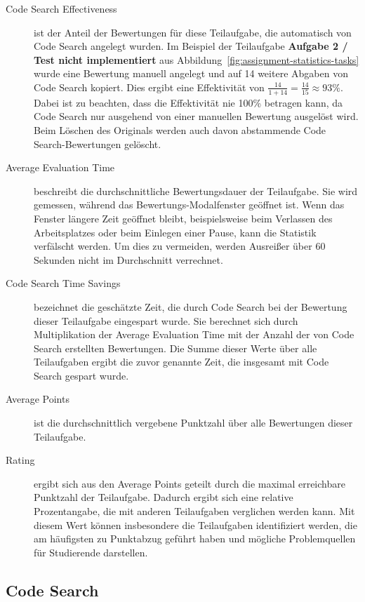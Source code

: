 \begin{description}
    \item[Code Search Effectiveness] ist der Anteil der Bewertungen für diese Teilaufgabe, die automatisch von Code Search angelegt wurden.
    Im Beispiel der Teilaufgabe \textbf{Aufgabe 2 / Test nicht implementiert} aus Abbildung~\ref{fig:assignment-statistics-tasks} wurde eine Bewertung manuell angelegt und auf 14 weitere Abgaben von Code Search kopiert.
    Dies ergibt eine Effektivität von $\frac{14}{1 + 14} = \frac{14}{15} \approx 93\%$.
    Dabei ist zu beachten, dass die Effektivität nie 100\% betragen kann, da Code Search nur ausgehend von einer manuellen Bewertung ausgelöst wird.
    Beim Löschen des Originals werden auch davon abstammende Code Search-Bewertungen gelöscht.
    \item[Average Evaluation Time] beschreibt die durchschnittliche Bewertungsdauer der Teilaufgabe.
    Sie wird gemessen, während das Bewertungs-Modalfenster geöffnet ist.
    Wenn das Fenster längere Zeit geöffnet bleibt, beispielsweise beim Verlassen des Arbeitsplatzes oder beim Einlegen einer Pause, kann die Statistik verfälscht werden.
    Um dies zu vermeiden, werden Ausreißer über 60 Sekunden nicht im Durchschnitt verrechnet.
    \item[Code Search Time Savings] bezeichnet die geschätzte Zeit, die durch Code Search bei der Bewertung dieser Teilaufgabe eingespart wurde.
    Sie berechnet sich durch Multiplikation der Average Evaluation Time mit der Anzahl der von Code Search erstellten Bewertungen.
    Die Summe dieser Werte über alle Teilaufgaben ergibt die zuvor genannte Zeit, die insgesamt mit Code Search gespart wurde.
    \item[Average Points] ist die durchschnittlich vergebene Punktzahl über alle Bewertungen dieser Teilaufgabe.
    \item[Rating] ergibt sich aus den Average Points geteilt durch die maximal erreichbare Punktzahl der Teilaufgabe.
    Dadurch ergibt sich eine relative Prozentangabe, die mit anderen Teilaufgaben verglichen werden kann.
    Mit diesem Wert können insbesondere die Teilaufgaben identifiziert werden, die am häufigsten zu Punktabzug geführt haben und mögliche Problemquellen für Studierende darstellen.
\end{description}

\subsection{Code Search}\label{subsec:code-search}

